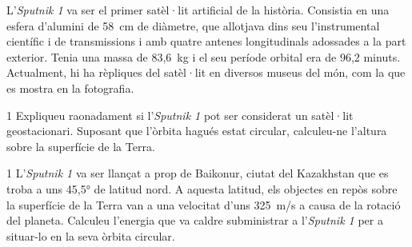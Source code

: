 L'\textit{Sputnik 1} va ser el primer satèl·lit artificial de la història. Consistia en una esfera d'alumini de 58~cm de diàmetre, que allotjava dins seu l'instrumental científic i de transmissions i amb quatre antenes longitudinals adossades a la part exterior. Tenia una massa de 83,6~kg i el seu període orbital era de 96,2 minuts. Actualment, hi ha rèpliques del satèl·lit en diversos museus del món, com la que es mostra en la fotografia.


\begin{apartat}{1}
Expliqueu raonadament si l'\textit{Sputnik 1} pot ser considerat un satèl·lit geostacionari. Suposant que l'òrbita hagués estat circular, calculeu-ne l'altura sobre la superfície de la Terra.
\end{apartat}

\begin{apartat}{1}
L'\textit{Sputnik 1} va ser llançat a prop de Baikonur, ciutat del Kazakhstan que es troba a uns 45,5° de latitud nord. A aquesta latitud, els objectes en repòs sobre la superfície de la Terra van a una velocitat d'uns 325~m/s a causa de la rotació del planeta. Calculeu l'energia que va caldre subministrar a l'\textit{Sputnik 1} per a situar-lo en la seva òrbita circular.
\end{apartat}


